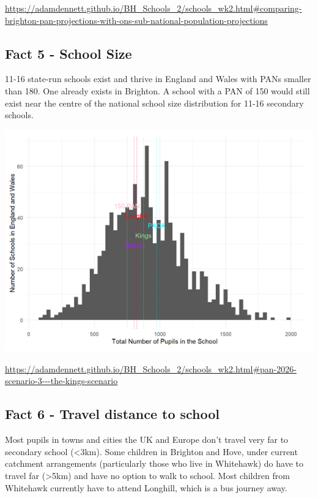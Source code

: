\documentclass[
  letterpaper,
  DIV=11,
  numbers=noendperiod]{scrartcl}
\begin{document}
\url{https://adamdennett.github.io/BH_Schools_2/schools_wk2.html\#comparing-brighton-pan-projections-with-ons-sub-national-population-projections}

\hypertarget{fact-5---school-size}{%
\subsection{Fact 5 - School Size}\label{fact-5---school-size}}

11-16 state-run schools exist and thrive in England and Wales with PANs
smaller than 180. One already exists in Brighton. A school with a PAN of
150 would still exist near the centre of the national school size
distribution for 11-16 secondary schools.

\includegraphics{images/school_size_hist.png}

\url{https://adamdennett.github.io/BH_Schools_2/schools_wk2.html\#pan-2026-scenario-3---the-kings-scenario}

\hypertarget{fact-6---travel-distance-to-school}{%
\subsection{Fact 6 - Travel distance to
school}\label{fact-6---travel-distance-to-school}}

Most pupils in towns and cities the UK and Europe don't travel very far
to secondary school (\textless3km). Some children in Brighton and Hove,
under current catchment arrangements (particularly those who live in
Whitehawk) do have to travel far (\textgreater5km) and have no option to
walk to school. Most children from Whitehawk currently have to attend
Longhill, which is a bus journey away.
\end{document}
